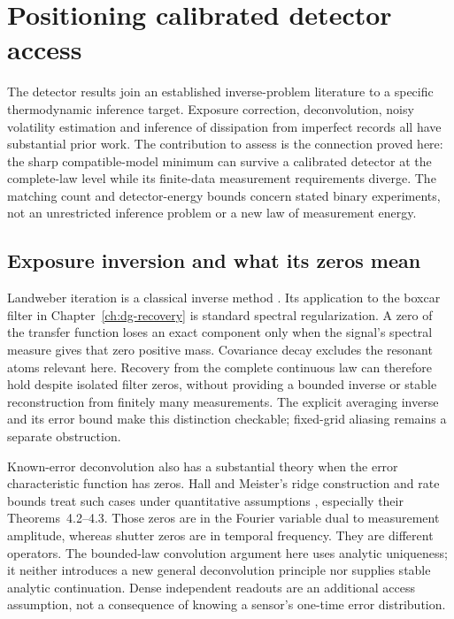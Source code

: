 \chapter{Positioning calibrated detector access}
\label{ch:dg-literature}

The detector results join an established inverse-problem literature to a
specific thermodynamic inference target. Exposure correction, deconvolution,
noisy volatility estimation and inference of dissipation from imperfect
records all have substantial prior work. The contribution to assess is the
connection proved here: the sharp compatible-model minimum can survive a
calibrated detector at the complete-law level while its finite-data
measurement requirements diverge. The matching count and detector-energy
bounds concern stated binary experiments, not an unrestricted inference
problem or a new law of measurement energy.

\section{Exposure inversion and what its zeros mean}
Landweber iteration is a classical inverse method
\cite{dgLandweber1951}. Its application to the boxcar filter in
Chapter~\ref{ch:dg-recovery} is standard spectral regularization. A zero
of the transfer function loses an exact component only when the signal's
spectral measure gives that zero positive mass. Covariance decay excludes
the resonant atoms relevant here. Recovery from the complete continuous
law can therefore hold despite isolated filter zeros, without providing a
bounded inverse or stable reconstruction from finitely many measurements.
The explicit averaging inverse and its error bound make this distinction
checkable; fixed-grid aliasing remains a separate obstruction.

Known-error deconvolution also has a substantial theory when the error
characteristic function has zeros. Hall and Meister's ridge construction
and rate bounds treat such cases under quantitative assumptions
\cite{dgHall2007}, especially their Theorems~4.2--4.3. Those zeros are in
the Fourier variable dual to measurement amplitude, whereas shutter zeros
are in temporal frequency. They are different operators. The bounded-law
convolution argument here uses analytic uniqueness; it neither introduces a
new general deconvolution principle nor supplies stable analytic
continuation. Dense independent readouts are an additional access assumption,
not a consequence of knowing a sensor's one-time error distribution.


